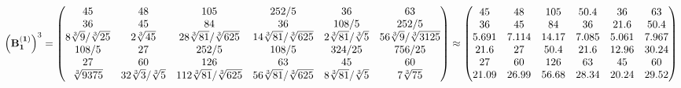 \documentclass[10pt,a4paper]{article}
\begin{document}
	\[
		\left(\bold{B_1^{(1)}}\right)^{3} = 
		\begin{pmatrix}
			{{45}}{} & {{48}}{} & {{105}}{} & {{252}} / {{5}} & {{36}}{} & {{63}}{} \\
			{{36}}{} & {{45}}{} & {{84}}{} & {{36}}{} & {{108}} / {{5}} & {{252}} / {{5}} \\
			{{8}\sqrt[3]{9}} / {\sqrt[3]{25}} & {{2}\sqrt[3]{45}}{} & {{28}\sqrt[3]{81}} / {\sqrt[3]{625}} & {{14}\sqrt[3]{81}} / {\sqrt[3]{625}} & {{2}\sqrt[3]{81}} / {\sqrt[3]{5}} & {{56}\sqrt[3]{9}} / {\sqrt[3]{3125}} \\
			{{108}} / {{5}} & {{27}}{} & {{252}} / {{5}} & {{108}} / {{5}} & {{324}} / {{25}} & {{756}} / {{25}} \\
			{{27}}{} & {{60}}{} & {{126}}{} & {{63}}{} & {{45}}{} & {{60}}{} \\
			{\sqrt[3]{9375}}{} & {{32}\sqrt[3]{3}} / {\sqrt[3]{5}} & {{112}\sqrt[3]{81}} / {\sqrt[3]{625}} & {{56}\sqrt[3]{81}} / {\sqrt[3]{625}} & {{8}\sqrt[3]{81}} / {\sqrt[3]{5}} & {{7}\sqrt[3]{75}}{} \\
		\end{pmatrix}
		\approx
		\begin{pmatrix}
			45       & 48       & 105      & 50.4     & 36       & 63       \\
			36       & 45       & 84       & 36       & 21.6     & 50.4     \\
			5.691    & 7.114    & 14.17    & 7.085    & 5.061    & 7.967    \\
			21.6     & 27       & 50.4     & 21.6     & 12.96    & 30.24    \\
			27       & 60       & 126      & 63       & 45       & 60       \\
			21.09    & 26.99    & 56.68    & 28.34    & 20.24    & 29.52    \\
		\end{pmatrix}
	\]
\end{document}
